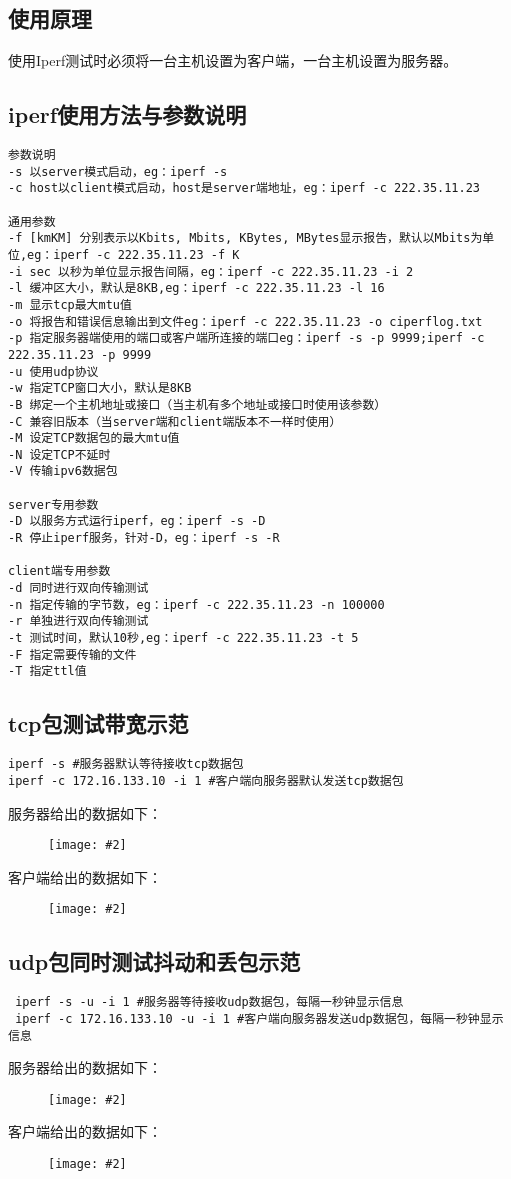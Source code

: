 \documentclass[a4paper,left=1.5cm,right=1.5cm,11pt]{article}
\newcommand{\sizedfic}[2]{\begin{figure}[H]
		\center
		\texttt{[image: \#2]}
	\end{figure}}
\begin{document}
\subsection{使用原理}
使用Iperf测试时必须将一台主机设置为客户端，一台主机设置为服务器。
\subsection{iperf使用方法与参数说明}
\begin{lstlisting}
参数说明
-s 以server模式启动，eg：iperf -s
-c host以client模式启动，host是server端地址，eg：iperf -c 222.35.11.23
 
通用参数
-f [kmKM] 分别表示以Kbits, Mbits, KBytes, MBytes显示报告，默认以Mbits为单位,eg：iperf -c 222.35.11.23 -f K
-i sec 以秒为单位显示报告间隔，eg：iperf -c 222.35.11.23 -i 2
-l 缓冲区大小，默认是8KB,eg：iperf -c 222.35.11.23 -l 16
-m 显示tcp最大mtu值
-o 将报告和错误信息输出到文件eg：iperf -c 222.35.11.23 -o ciperflog.txt
-p 指定服务器端使用的端口或客户端所连接的端口eg：iperf -s -p 9999;iperf -c 222.35.11.23 -p 9999
-u 使用udp协议
-w 指定TCP窗口大小，默认是8KB
-B 绑定一个主机地址或接口（当主机有多个地址或接口时使用该参数）
-C 兼容旧版本（当server端和client端版本不一样时使用）
-M 设定TCP数据包的最大mtu值
-N 设定TCP不延时
-V 传输ipv6数据包
 
server专用参数
-D 以服务方式运行iperf，eg：iperf -s -D
-R 停止iperf服务，针对-D，eg：iperf -s -R
 
client端专用参数
-d 同时进行双向传输测试
-n 指定传输的字节数，eg：iperf -c 222.35.11.23 -n 100000
-r 单独进行双向传输测试
-t 测试时间，默认10秒,eg：iperf -c 222.35.11.23 -t 5
-F 指定需要传输的文件
-T 指定ttl值
\end{lstlisting}
\subsection{tcp包测试带宽示范}
\begin{lstlisting}
iperf -s #服务器默认等待接收tcp数据包
iperf -c 172.16.133.10 -i 1 #客户端向服务器默认发送tcp数据包
\end{lstlisting}
服务器给出的数据如下：
\sizedfic{0.8}{iperf_tcp.png}
客户端给出的数据如下：
\sizedfic{0.8}{iperf_tcp2.png}
\subsection{udp包同时测试抖动和丢包示范}
\begin{lstlisting}
 iperf -s -u -i 1 #服务器等待接收udp数据包，每隔一秒钟显示信息
 iperf -c 172.16.133.10 -u -i 1 #客户端向服务器发送udp数据包，每隔一秒钟显示信息
\end{lstlisting}
服务器给出的数据如下：
\sizedfic{0.8}{iperf_udp1.png}
客户端给出的数据如下：
\sizedfic{0.8}{iperf_udp2.png}
\end{document}
